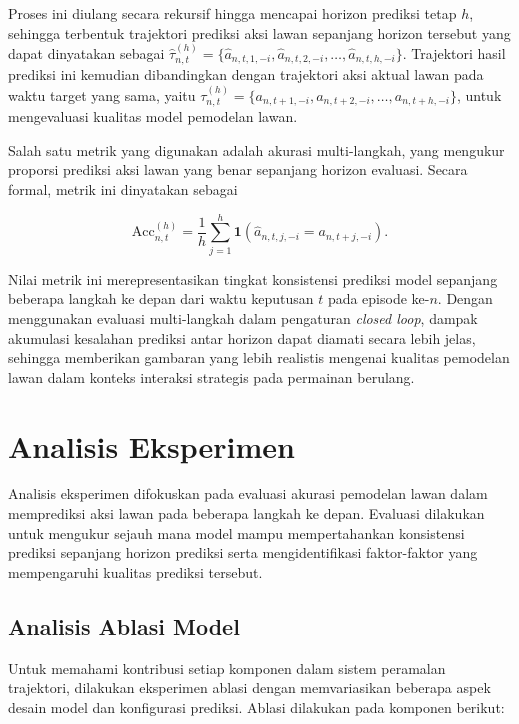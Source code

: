 Proses ini diulang secara rekursif hingga mencapai horizon prediksi tetap $h$, sehingga terbentuk trajektori prediksi aksi lawan sepanjang horizon tersebut yang dapat dinyatakan sebagai $\hat{\tau}_{n,t}^{(h)} = \{ \hat{a}_{n,t,1,-i}, \hat{a}_{n,t,2,-i}, \dots, \hat{a}_{n,t,h,-i} \}$. Trajektori hasil prediksi ini kemudian dibandingkan dengan trajektori aksi aktual lawan pada waktu target yang sama, yaitu $\tau_{n,t}^{(h)} = \{ a_{n,t+1,-i}, a_{n,t+2,-i}, \dots, a_{n,t+h,-i} \}$, untuk mengevaluasi kualitas model pemodelan lawan.

Salah satu metrik yang digunakan adalah akurasi multi-langkah, yang mengukur proporsi prediksi aksi lawan yang benar sepanjang horizon evaluasi. Secara formal, metrik ini dinyatakan sebagai

\begin{equation}
\text{Acc}_{n,t}^{(h)} 
= \frac{1}{h} 
\sum_{j=1}^{h} 
\mathbf{1} \left( 
\hat{a}_{n,t,j,-i} = a_{n,t+j,-i} 
\right).
\end{equation}

Nilai metrik ini merepresentasikan tingkat konsistensi prediksi model sepanjang beberapa langkah ke depan dari waktu keputusan $t$ pada episode ke-$n$. Dengan menggunakan evaluasi multi-langkah dalam pengaturan \textit{closed loop}, dampak akumulasi kesalahan prediksi antar horizon dapat diamati secara lebih jelas, sehingga memberikan gambaran yang lebih realistis mengenai kualitas pemodelan lawan dalam konteks interaksi strategis pada permainan berulang.

\section{Analisis Eksperimen}

Analisis eksperimen difokuskan pada evaluasi akurasi pemodelan lawan dalam memprediksi aksi lawan pada beberapa langkah ke depan. Evaluasi dilakukan untuk mengukur sejauh mana model mampu mempertahankan konsistensi prediksi sepanjang horizon prediksi serta mengidentifikasi faktor-faktor yang mempengaruhi kualitas prediksi tersebut.

\subsection{Analisis Ablasi Model}

Untuk memahami kontribusi setiap komponen dalam sistem peramalan trajektori, dilakukan eksperimen ablasi dengan memvariasikan beberapa aspek desain model dan konfigurasi prediksi. Ablasi dilakukan pada komponen berikut:

